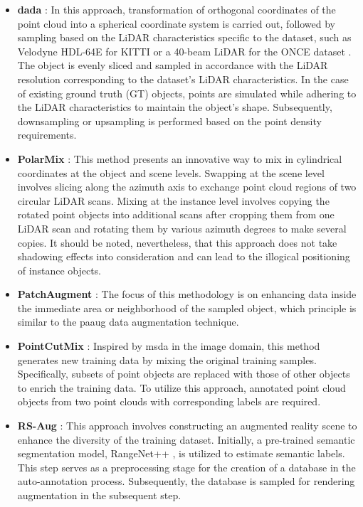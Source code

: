 \begin{itemize}
    \item \textbf{\acrfull{dada}} :  \parencite{dada_2023} In this approach, transformation of orthogonal coordinates of the point cloud into a spherical coordinate system is carried out, followed by sampling based on the LiDAR characteristics specific to the dataset, such as Velodyne HDL-64E for KITTI \parencite{Geiger2012CVPR} or a 40-beam LiDAR for the ONCE dataset \parencite{mao2021one}. The object is evenly sliced and sampled in accordance with the LiDAR resolution corresponding to the dataset's LiDAR characteristics. In the case of existing ground truth (GT) objects, points are simulated while adhering to the LiDAR characteristics to maintain the object's shape. Subsequently, downsampling or upsampling is performed based on the point density requirements.
    \item \textbf{PolarMix} : This method \parencite{xiao2022polarmix} presents an innovative way to mix in cylindrical coordinates at the object and scene levels. Swapping at the scene level involves slicing along the azimuth axis to exchange point cloud regions of two circular LiDAR scans. Mixing at the instance level involves copying the rotated point objects into additional scans after cropping them from one LiDAR scan and rotating them by various azimuth degrees to make several copies. It should be noted, nevertheless, that this approach does not take shadowing effects into consideration and can lead to the illogical positioning of instance objects.
    \item \textbf{PatchAugment} : The focus of this methodology \parencite{patch_aug_2021} is on enhancing data inside the immediate area or neighborhood of the sampled object, which principle is similar to the \acrshort{paaug} data augmentation technique.
    \item \textbf{PointCutMix} : Inspired by \acrfull{msda} in the image domain, this method \parencite{pointcutmix_2021} generates new training data by mixing the original training samples. Specifically, subsets of point objects are replaced with those of other objects to enrich the training data. To utilize this approach, annotated point cloud objects from two point clouds with corresponding labels are required.
    \item \textbf{RS-Aug} : This approach \parencite{rs_aug_2023} involves constructing an augmented reality scene to enhance the diversity of the training dataset. Initially, a pre-trained semantic segmentation model, RangeNet++ \parencite{rangenetplus2019}, is utilized to estimate semantic labels. This step serves as a preprocessing stage for the creation of a database in the auto-annotation process. Subsequently, the database is sampled for rendering augmentation in the subsequent step.

\end{itemize}
